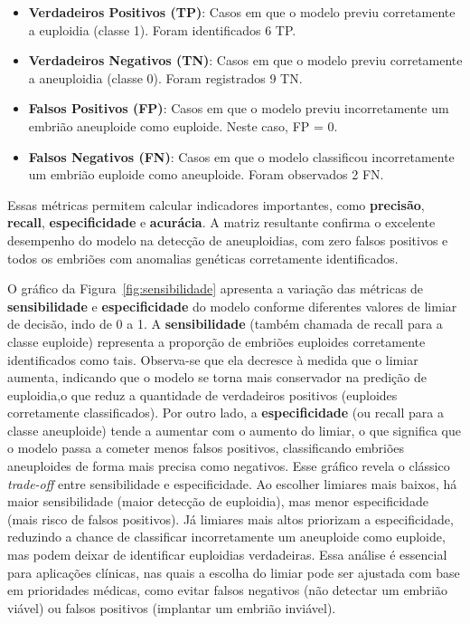 \begin{itemize}
    \item \textbf{Verdadeiros Positivos (TP)}: Casos em que o modelo previu corretamente a euploidia (classe 1). Foram identificados 6 TP.
    \item \textbf{Verdadeiros Negativos (TN)}: Casos em que o modelo previu corretamente a aneuploidia (classe 0). Foram registrados 9 TN.
    \item \textbf{Falsos Positivos (FP)}: Casos em que o modelo previu incorretamente um embrião aneuploide como euploide. Neste caso, FP = 0.
    \item \textbf{Falsos Negativos (FN)}: Casos em que o modelo classificou incorretamente um embrião euploide como aneuploide. Foram observados 2 FN.
\end{itemize}

Essas métricas permitem calcular indicadores importantes, como \textbf{precisão}, \textbf{recall}, \textbf{especificidade} e \textbf{acurácia}. A matriz resultante confirma o excelente desempenho do modelo na detecção de aneuploidias, com zero falsos positivos e todos os embriões com anomalias genéticas corretamente identificados.

O gráfico da Figura~\ref{fig:sensibilidade} apresenta a variação das métricas de \textbf{sensibilidade} e \textbf{especificidade} do modelo conforme diferentes valores de limiar de decisão, indo de 0 a 1. A \textbf{sensibilidade} (também chamada de recall para a classe euploide) representa a proporção de embriões euploides corretamente identificados como tais. Observa-se que ela decresce à medida que o limiar aumenta, indicando que o modelo se torna mais conservador na predição de euploidia,o que reduz a quantidade de verdadeiros positivos (euploides corretamente classificados). Por outro lado, a \textbf{especificidade} (ou recall para a classe aneuploide) tende a aumentar com o aumento do limiar, o que significa que o modelo passa a cometer menos falsos positivos, classificando embriões aneuploides de forma mais precisa como negativos. Esse gráfico revela o clássico \textit{trade-off} entre sensibilidade e especificidade. Ao escolher limiares mais baixos, há maior sensibilidade (maior detecção de euploidia), mas menor especificidade (mais risco de falsos positivos). Já limiares mais altos priorizam a especificidade, reduzindo a chance de classificar incorretamente um aneuploide como euploide, mas podem deixar de identificar euploidias verdadeiras. Essa análise é essencial para aplicações clínicas, nas quais a escolha do limiar pode ser ajustada com base em prioridades médicas, como evitar falsos negativos (não detectar um embrião viável) ou falsos positivos (implantar um embrião inviável).

